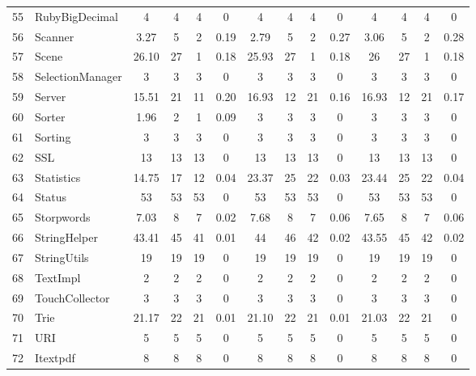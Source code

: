 \documentclass[conference]{IEEEtran}
\begin{document}
\begin{table} [ht]
{\begin{tabular}{|c|l|c|c|c|c|c|c|c|c|c|c|c|c|}
 55						& RubyBigDecimal				& 4 	&	4	&	4	& 		0					& 4		& 4 		& 4		& 		0			& 4			& 4			& 4			&	0\\      
 56						& Scanner					& 3.27&	5	&	2	& 		0.19					& 2.79	& 5 		& 2		& 		0.27			& 3.06		& 5			& 2			&	0.28\\      
 57						& Scene						& 26.10&	27	&	1	& 		0.18					& 25.93	& 27 		& 1		& 		0.18			& 26			& 27			& 1			&	0.18\\      
 58						& SelectionManager				& 3	&	3	&	3	& 		0					& 3		& 3 		& 3		& 		0			& 3			& 3			& 3			&	0\\      
 59						& Server						& 15.51&	21	&	11	& 		0.20					& 16.93	& 12 		& 21		& 		0.16			& 16.93		& 12			& 21			&	0.17\\      
 60						& Sorter						& 1.96&	2	&	1	& 		0.09					& 	3	& 3 		& 3		& 		0			& 3			& 3			& 3			&	0\\      
 61						& Sorting						& 3	&	3	&	3	& 		0					& 	3	& 3 		& 3		& 		0			& 3			& 3			& 3			&	0\\      
 62						& SSL						&13	&	13	&	13	& 		0					& 13		& 13 		& 13		& 		0			& 13			& 13			& 13			&	0\\      
 63						& Statistics					& 14.75&	17	&	12	&	 	0.04					& 23.37	& 25 		& 22		& 		0.03			& 23.44		& 25			& 22			&	0.04\\      
 64						& Status						& 53	&	53	&	53	& 		0					& 53		& 53 		& 53		& 		0			& 53			& 53			& 53			&	0\\      
 65						& Storpwords					& 7.03&	8	&	7	& 		0.02					& 7.68	&  8		& 7		& 		0.06			& 7.65		& 8			& 7			&	0.06\\      
 66						& StringHelper					& 43.41& 45	&	41	& 		0.01					& 44		&  46		& 42		& 		0.02			& 43.55		& 45			& 42			&	0.02\\      
 67						& StringUtils					&19 	&	19	&	19	& 		0					& 19		& 19 		& 19		& 		0			& 19			& 19			& 19			&	0\\      
 68						& TextImpl					& 2 	&	2	&	2	& 		0					& 2		&  2		& 2		& 		0			& 2			& 2			& 2			&	0\\      
 69						& TouchCollector				& 3	&	3	&	3	& 		0					& 3		&  3		& 3		& 		0			& 3			& 3			& 3			&	0\\      
 70						& Trie						& 21.17&	22	&	21	& 		0.01					& 21.10	&  22		& 21		& 		0.01			& 21.03		& 22			& 21			&	0\\      
 71						& URI						& 5 	&	5	&	5	& 		0					& 5		&  5		& 5		& 		0			& 5			& 5			& 5			&	0\\      
 72						& Itextpdf						& 8	&	8	&	8	& 		0					& 8		&  8		& 8		& 		0			& 8			& 8			& 8			&	0\\      

\end{tabular}}
\end{table}
\end{document}
